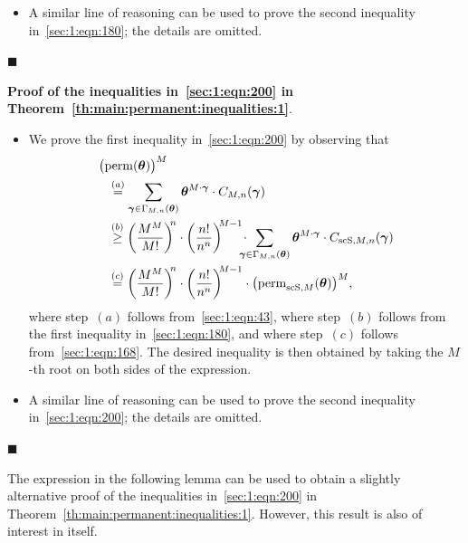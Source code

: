 \documentclass[journal,lettersize,twocolumn]{IEEEtran} %
\renewcommand\qedsymbol{$\blacksquare$}
\newcommand{\etheoremproof}{\hfill\qedsymbol}
\newcommand{\vect}[1]{ \bm{#1} }
\newcommand{\vgam}{ \vect{\gamma} }
\newcommand{\matr}[1]{ \bm{#1} }
\newcommand{\perm}{ \mathrm{perm} }
\newcommand{\permscsM}[1]{ \mathrm{perm}_{\mathrm{scS},#1} }
\newcommand{\CM}[1]{\Cgen{M}{#1}}
\newcommand{\Cgen}[2]{C_{#1,#2}}
\newcommand{\CscSgen}[2]{C_{\mathrm{scS},#1,#2}}
\newcommand{\mtheta}{\matr{\theta}}
\newcommand{\vtheta}{\matr{\theta}}
\newcommand{\GamMnthe}{ \Gamma_{M,n}(\vtheta) }
\begin{document}
\begin{itemize}
\item A similar line of reasoning can be used to prove the second inequality
  in~\eqref{sec:1:eqn:180}; the details are omitted.

\end{itemize}
\etheoremproof

%

\medskip

\noindent
\textbf{Proof of the inequalities in~\eqref{sec:1:eqn:200} in
  Theorem~\ref{th:main:permanent:inequalities:1}}.
\begin{itemize}

\item We prove the first inequality in~\eqref{sec:1:eqn:200} by observing that
  \begin{align*}
    \hspace{0.25cm}&\hspace{-0.25cm}
    \bigl( \perm(\mtheta) \bigr)^M \\
      &\overset{(a)}{=}
         \sum_{\vgam \in \GamMnthe} 
           \mtheta^{ M \cdot \vgam }
         \cdot
         \CM{n}( \vgam )
           \nonumber \\
      &\overset{(b)}{\geq} 
         \left( \frac{M^{M}}{M!} \right)^{\!\! n}
         \cdot
         \left(
           \frac{ n! }{ n^{n} }
         \right)^{\!\! M-1} 
         \! \cdot \!\!\!\!\!
         \sum_{\vgam \in \GamMnthe} 
           \mtheta^{ M \cdot \vgam }
         \cdot
         \CscSgen{M}{n}( \vgam )
          \nonumber \\
      &\overset{(c)}{=} 
         \left( \frac{M^{M}}{M!} \right)^{\!\! n}
         \cdot
         \left(
           \frac{ n! }{ n^{n} }
         \right)^{\!\! M-1} 
         \cdot 
         \bigl( \permscsM{M}(\mtheta) \bigr)^M,
  \end{align*}
  where step~$(a)$ follows from~\eqref{sec:1:eqn:43}, where step~$(b)$ follows
  from the first inequality in~\eqref{sec:1:eqn:180}, and where step~$(c)$
  follows from~\eqref{sec:1:eqn:168}. The desired inequality is then obtained
  by taking the $M$-th root on both sides of the expression.

\item A similar line of reasoning can be used to prove the second inequality
  in~\eqref{sec:1:eqn:200}; the details are omitted.

\end{itemize}
\etheoremproof

%

The expression in the following lemma can be used to obtain a slightly
alternative proof of the inequalities in~\eqref{sec:1:eqn:200} in
Theorem~\ref{th:main:permanent:inequalities:1}. However, this result is also
of interest in itself.
\end{document}
